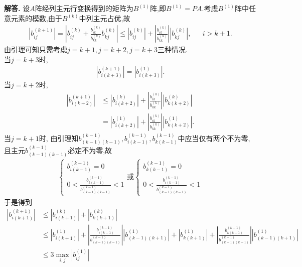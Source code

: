\documentclass[12pt, a4paper, oneside, UTF8]{ctexart}
\newenvironment{solution}{\par\noindent\textbf{解答. }}{\par}
\begin{document}
\begin{solution}
    设$A$阵经列主元行变换得到的矩阵为$B^{(1)}$阵,即$B^{(1)}=PA$.考虑$B^{(1)}$阵中任意元素的模数,由于$B^{(k)}$中列主元占优,故
    \begin{align*}
        |{b_{ij}^{(k+1)}}|=|{b_{ij}^{(k)}+\frac{b_{ik}^{(k)}}{b_{kk}^{(k)}}{b_{kj}^{(k)}}}|\leq{|{b_{ij}^{(k)}}|+|\frac{b_{ik}^{(k)}}{b_{kk}^{(k)}}||{b_{kj}^{(k)}}|},&&i>k+1.
    \end{align*}
    由引理可知只需考虑$j=k+1,j=k+2,j=k+3$三种情况.\\
    当$j=k+3$时,
    \begin{align*}
        |{b_{i(k+3)}^{(k+1)}}|=|{b_{i(k+3)}^{(1)}}|.
    \end{align*}
    当$j=k+2$时,
    \begin{align*}
        |{b_{i(k+2)}^{(k+1)}}|&\leq{|{b_{i(k+2)}^{(k)}}|+|\frac{b_{ik}^{(k)}}{b_{kk}^{(k)}}||{b_{k(k+2)}^{(k)}}|}\\
        &={|{b_{i(k+2)}^{(1)}}|+|\frac{b_{ik}^{(k)}}{b_{kk}^{(k)}}||{b_{k(k+2)}^{(1)}}|}.
    \end{align*}
    当$j=k+1$时,
    由引理知${b_{(k-1)(k-1)}^{(k-1)}},{b_{i(k-1)}^{(k-1)}},{b_{k(k-1)}^{(k-1)}}$中应当仅有两个不为零,且主元${b_{(k-1)(k-1)}^{(k-1)}}$必定不为零,故
    \begin{align*}
        \left\{
            \begin{array}{ll}
                {b_{i(k-1)}^{(k-1)}}=0 \\
                {0}<\frac{b_{k(k-1)}^{(k-1)}}{b_{(k-1)(k-1)}^{(k-1)}}<1
            \end{array}
        \right.
        \text{或}
        \left\{
            \begin{array}{ll}
                {b_{k(k-1)}^{(k-1)}}=0 \\
                {0}<\frac{b_{i(k-1)}^{(k-1)}}{b_{(k-1)(k-1)}^{(k-1)}}<1
            \end{array}
        \right.
    \end{align*}
    于是得到
    \begin{align*}
        |{b_{i(k+1)}^{(k+1)}}|&\leq{|{b_{i(k+1)}^{(k)}}|+|{b_{k(k+1)}^{(k)}}|}\\
        &\leq{|{b_{i(k+1)}^{(1)}}|+|\frac{b_{i(k-1)}^{(k-1)}}{b_{(k-1)(k-1)}^{(k-1)}}||{b_{(k-1)(k+1)}^{(1)}}|+|{b_{k(k+1)}^{(1)}}|+|\frac{b_{k(k-1)}^{(k-1)}}{b_{(k-1)(k-1)}^{(k-1)}}||{b_{(k-1)(k+1)}^{(1)}}|}\\
        &\leq{3\max\limits_{i,j}{|b_{ij}^{(1)}|}}
    \end{align*}

\end{solution}
\end{document}
